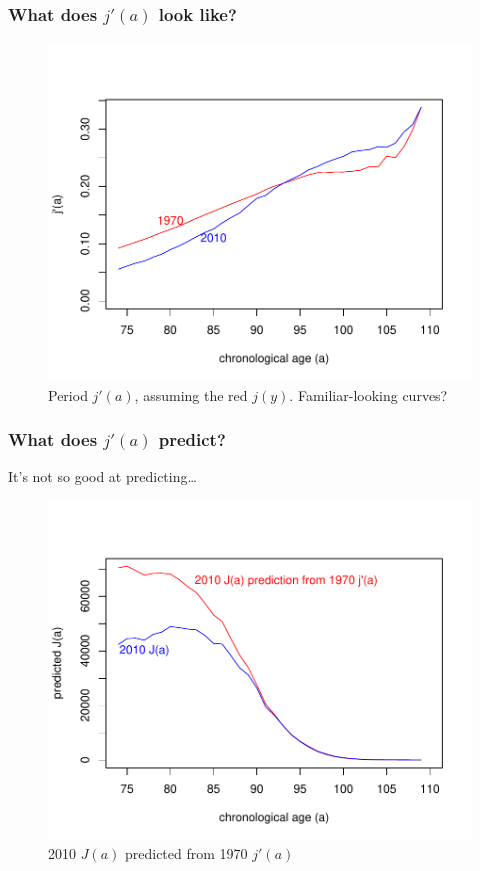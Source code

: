 \documentclass[20pt]{beamer}
\begin{document}
\begin{frame}
\frametitle{What does $j'(a)$ look like?}
\begin{figure}[b]
    \centering
    \caption{Period $j'(a)$, assuming the red $j(y)$. Familiar-looking
    curves?\footnotemark}
    \vspace{-3em}
    \includegraphics[scale=1.2]{Figures/jprimeaExample.pdf}
\end{figure} 
\end{frame}

\begin{frame}
\frametitle{What does $j'(a)$ predict?}
It's not so good at predicting\ldots
\begin{figure}[b]
    \centering
    \caption{2010 $J(a)$ predicted from 1970 $j'(a)$}
    \vspace{-3em}
    \includegraphics[scale=1.2]{Figures/jprimeaBadExample.pdf}
\end{figure} 
\end{frame}
\end{document}
